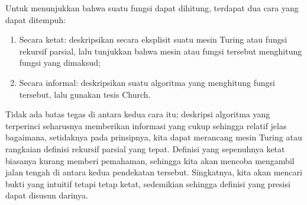 \documentclass[../../../include/open-logic-section]{subfiles}
\begin{document}
Untuk menunjukkan bahwa suatu fungsi dapat dihitung, terdapat dua cara yang
dapat ditempuh:
\begin{enumerate}
\item Secara ketat: deskripsikan secara eksplisit suatu mesin Turing atau
  fungsi rekursif parsial, lalu tunjukkan bahwa mesin atau fungsi tersebut
  menghitung fungsi yang dimaksud;
\item Secara informal: deskripsikan suatu algoritma yang menghitung fungsi
  tersebut, lalu gunakan tesis Church.
\end{enumerate}
Tidak ada batas tegas di antara kedua cara itu; deskripsi algoritma yang
terperinci seharusnya memberikan informasi yang cukup sehingga relatif jelas
bagaimana, setidaknya pada prinsipnya, kita dapat merancang mesin Turing atau
rangkaian definisi rekursif parsial yang tepat. Definisi yang sepenuhnya ketat
biasanya kurang memberi pemahaman, sehingga kita akan mencoba mengambil jalan
tengah di antara kedua pendekatan tersebut. Singkatnya, kita akan mencari
bukti yang intuitif tetapi tetap ketat, sedemikian sehingga definisi yang
presisi dapat disusun darinya.
\end{document}

